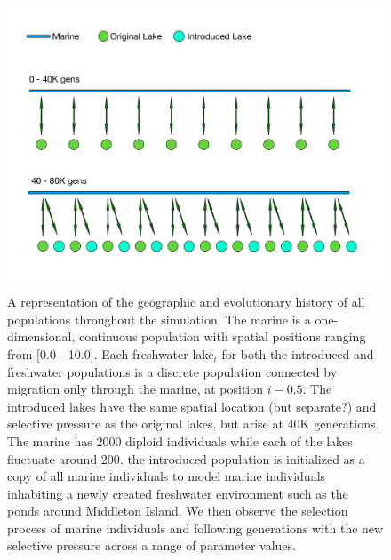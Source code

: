 \documentclass{article}
\begin{document}
\begin{figure}
	\begin{center}
  		\includegraphics[width=0.6\linewidth]{GeographyDiagram}
  		\caption{A representation of the geographic and evolutionary history of all populations throughout the simulation. 
		The marine is a one-dimensional, continuous population with spatial positions ranging from [0.0 - 10.0]. 
		Each freshwater lake$_{i}$ for both the introduced and freshwater populations
		is a discrete population connected by migration only through the marine, at position $i - 0.5$. 
		The introduced lakes have the same spatial location (but separate?) and selective pressure as the original lakes, but arise at 40K generations.
		The marine has $2000$ diploid individuals while each of the lakes fluctuate around $200$. 
		the introduced population is initialized as a copy of all marine individuals to model marine 
		individuals inhabiting a newly created freshwater environment such as the ponds around Middleton Island.
		We then observe the selection process of marine individuals and following generations 
		with the new selective pressure across a range of parameter values. 
		}
  		\label{fig:Geo}
	\end{center}
\end{figure}
\end{document}
